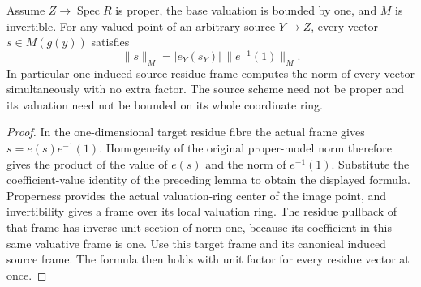 \begin{theorem}
\label{thm:proper-model-arbitrary-residue-vector-norm}
\leanok
Assume $Z\to\operatorname{Spec}R$ is proper, the base valuation is
bounded by one, and $M$ is invertible. For any valued point of an
arbitrary source $Y\to Z$, every vector $s\in M(g(y))$ satisfies
\[
 \|s\|_M=|e_Y(s_Y)|\,\|e^{-1}(1)\|_M.
\]
In particular one induced source residue frame computes the norm
of every vector simultaneously with no extra factor. The source
scheme need not be proper and its valuation need not be bounded
on its whole coordinate ring.
\end{theorem}
\begin{proof}
In the one-dimensional target residue fibre the actual frame gives
$s=e(s)e^{-1}(1)$. Homogeneity of the original proper-model norm
therefore gives the product of the value of $e(s)$ and the norm of
$e^{-1}(1)$. Substitute the coefficient-value identity of the preceding
lemma to obtain the displayed formula. Properness provides the actual
valuation-ring center of the image point, and invertibility gives a
frame over its local valuation ring. The residue pullback of that
frame has inverse-unit section of norm one, because its coefficient
in this same valuative frame is one. Use this target frame and its
canonical induced source frame. The formula then holds with unit
factor for every residue vector at once.
\end{proof}
